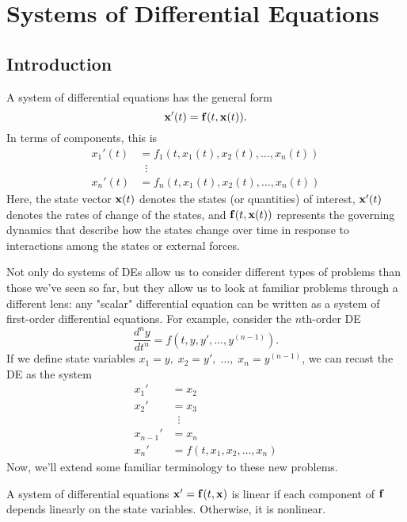 \documentclass[../m082main.tex]{subfiles}
\begin{document}
\chapter{Systems of Differential Equations}

\section{Introduction}
\medskip
\begin{definition}
    A system of differential equations has the general form
    \[ \mathbf{x}'(t) = \mathbf{f}(t, \mathbf{x}(t)). \]
    In terms of components, this is
    \begin{align*}
        x_1'(t) &= f_1 (t, x_1(t), x_2(t), \ldots, x_n(t)) \\
        &\;\;\vdots \\
        x_n'(t) &= f_n (t, x_1(t), x_2(t), \ldots, x_n(t))
    \end{align*}
    Here, the state vector $\mathbf{x}(t)$ denotes the states (or quantities) of interest, $\mathbf{x}'(t)$ denotes the rates of change of the states, and $\mathbf{f}(t, \mathbf{x}(t))$ represents the governing dynamics that describe how the states change over time in response to interactions among the states or external forces.
\end{definition}

Not only do systems of DEs allow us to consider different types of problems than those we've seen so far, but they allow us to look at familiar problems through a different lens: any "scalar" differential equation can be written as a system of first-order differential equations.
For example, consider the $n$th-order DE
\[ \frac{d^{n}y}{dt^{n}} = f(t, y, y', \ldots, y^{(n-1)}). \]
If we define state variables $x_1 = y,\; x_2 = y',\; \ldots,\; x_n = y^{(n-1)}$, we can recast the DE as the system
\begin{align*}
    x_1' &= x_2 \\
    x_2' &= x_3 \\
    &\;\;\vdots \\
    x_{n-1}' &= x_n \\
    x_n' &= f(t, x_1, x_2, \ldots, x_n)
\end{align*}
Now, we'll extend some familiar terminology to these new problems.

\begin{definition}
    A system of differential equations $\mathbf{x}' = \mathbf{f}(t, \mathbf{x})$ is linear if each component of $\mathbf{f}$ depends linearly on the state variables.
    Otherwise, it is nonlinear.
\end{definition}
\end{document}
